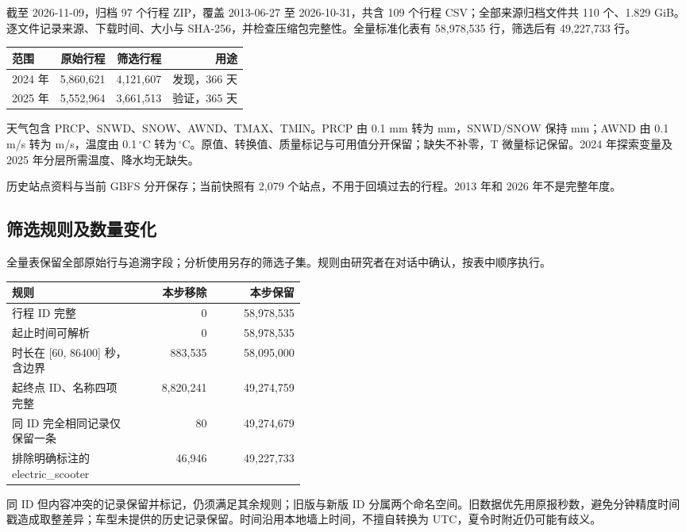 \documentclass[UTF8,fontset=fandol,a4paper,zihao=-4]{ctexart}
\begin{document}
截至 2026-11-09，归档 97 个行程 ZIP，覆盖 2013-06-27 至 2026-10-31，共含 109 个行程 CSV；全部来源归档文件共 110 个、1.829 GiB。逐文件记录来源、下载时间、大小与 SHA-256，并检查压缩包完整性。全量标准化表有 58,978,535 行，筛选后有 49,227,733 行。

\begin{center}
\begin{tabular}{lrrr}
\toprule
范围 & 原始行程 & 筛选行程 & 用途\\
\midrule
2024 年 & 5,860,621 & 4,121,607 & 发现，366 天\\
2025 年 & 5,552,964 & 3,661,513 & 验证，365 天\\
\bottomrule
\end{tabular}
\end{center}

天气包含 PRCP、SNWD、SNOW、AWND、TMAX、TMIN。PRCP 由 0.1 mm 转为 mm，SNWD/SNOW 保持 mm；AWND 由 0.1 m/s 转为 m/s，温度由 0.1\,$^\circ$C 转为\,$^\circ$C。原值、转换值、质量标记与可用值分开保留；缺失不补零，T 微量标记保留。2024 年探索变量及 2025 年分层所需温度、降水均无缺失。

历史站点资料与当前 GBFS 分开保存；当前快照有 2,079 个站点，不用于回填过去的行程。2013 年和 2026 年不是完整年度。

\subsection{筛选规则及数量变化}

全量表保留全部原始行与追溯字段；分析使用另存的筛选子集。规则由研究者在对话中确认，按表中顺序执行。

\begin{center}
\small
\begin{tabular}{p{0.43\linewidth}rr}
\toprule
规则 & 本步移除 & 本步保留\\
\midrule
行程 ID 完整 & 0 & 58,978,535\\
起止时间可解析 & 0 & 58,978,535\\
时长在 [60, 86400] 秒，含边界 & 883,535 & 58,095,000\\
起终点 ID、名称四项完整 & 8,820,241 & 49,274,759\\
同 ID 完全相同记录仅保留一条 & 80 & 49,274,679\\
排除明确标注的 electric\_scooter & 46,946 & 49,227,733\\
\bottomrule
\end{tabular}
\end{center}

同 ID 但内容冲突的记录保留并标记，仍须满足其余规则；旧版与新版 ID 分属两个命名空间。旧数据优先用原报秒数，避免分钟精度时间戳造成取整差异；车型未提供的历史记录保留。时间沿用本地墙上时间，不擅自转换为 UTC，夏令时附近仍可能有歧义。
\end{document}

